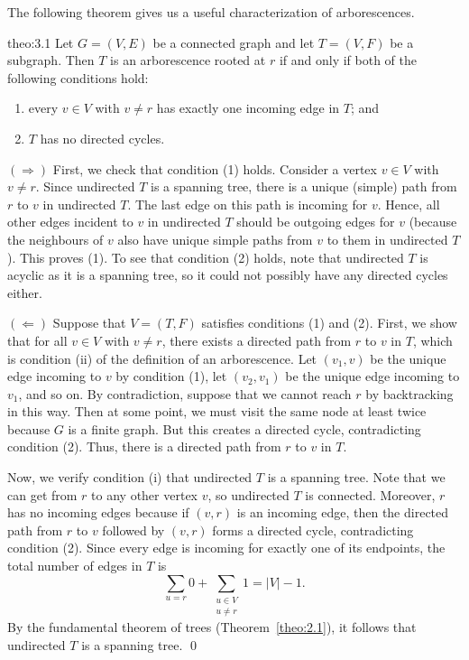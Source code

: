 \vspace{-0.25cm}
The following theorem gives us a useful characterization of arborescences.

\begin{theo}{theo:3.1}
    Let $G = (V, E)$ be a connected graph and let $T = (V, F)$ be a subgraph. 
    Then $T$ is an arborescence rooted at $r$ if and only if both 
    of the following conditions hold:
    \begin{enumerate}[(1)]
        \item every $v \in V$ with $v \neq r$ has exactly one incoming edge in $T$; and 
        \item $T$ has no directed cycles. 
    \end{enumerate}
\end{theo}
\begin{pf}
    $(\Rightarrow)$ First, we check that condition (1) holds. Consider a vertex 
    $v \in V$ with $v \neq r$. Since undirected $T$ is a spanning tree, 
    there is a unique (simple) path from $r$ to $v$ in undirected $T$. 
    The last edge on this path is incoming for $v$. Hence, all other edges 
    incident to $v$ in undirected $T$ should be outgoing edges for $v$ 
    (because the neighbours of $v$ also have unique simple paths from $v$ 
    to them in undirected $T$). This proves (1). To see that condition (2) 
    holds, note that undirected $T$ is acyclic as it is a spanning tree, 
    so it could not possibly have any directed cycles either. 

    $(\Leftarrow)$ Suppose that $V = (T, F)$ satisfies conditions (1) and (2). 
    First, we show that for all $v \in V$ with $v \neq r$, there exists 
    a directed path from $r$ to $v$ in $T$, which is condition (ii) of the 
    definition of an arborescence. Let $(v_1, v)$ be the unique edge 
    incoming to $v$ by condition (1), let $(v_2, v_1)$ be the unique edge 
    incoming to $v_1$, and so on. By contradiction, suppose that we 
    cannot reach $r$ by backtracking in this way. Then at some point, 
    we must visit the same node at least twice because $G$ is a finite graph. 
    But this creates a directed cycle, contradicting condition (2). Thus, 
    there is a directed path from $r$ to $v$ in $T$. 

    Now, we verify condition (i) that undirected $T$ is a spanning tree. 
    Note that we can get from $r$ to any other vertex $v$, so 
    undirected $T$ is connected. Moreover, $r$ has no incoming edges 
    because if $(v, r)$ is an incoming edge, then the directed path from 
    $r$ to $v$ followed by $(v, r)$ forms a directed cycle, contradicting 
    condition (2). Since every edge is incoming for exactly one of its 
    endpoints, the total number of edges in $T$ is 
    \[ \sum_{u=r} 0 + \sum_{\substack{u\in V \\ u\neq r}} 1 = |V| - 1. \] 
    By the fundamental theorem of trees (Theorem~\ref{theo:2.1}), 
    it follows that undirected $T$ is a spanning tree. \qed 
\end{pf}

